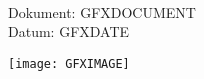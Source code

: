 ﻿\documentclass{scrartcl}
\begin{document}
\begin{tabbing}
\hspace{3cm} \= \\
Dokument: \> GFXDOCUMENT \\
Datum: \> GFXDATE \\
\end{tabbing}

\texttt{[image: GFXIMAGE]}
\end{document}

